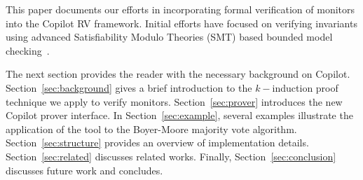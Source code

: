                                      
This paper documents our efforts in incorporating formal verification
of monitors into the Copilot RV framework.  Initial efforts have
focused on verifying invariants using advanced Satisfiability Modulo
Theories (SMT) based bounded model
checking~\cite{ClarkeBounded01}.  




The next section provides the reader with the necessary background on
Copilot. Section~\ref{sec:background} gives a brief introduction to
the $k-$induction proof technique we apply to verify
monitors.
Section~\ref{sec:prover} introduces the new Copilot prover
interface. In Section~\ref{sec:example}, several examples illustrate
the application of the tool to the Boyer-Moore majority vote
algorithm. Section~\ref{sec:structure} provides an overview of
implementation details. Section~\ref{sec:related} discusses related
works. Finally, Section~\ref{sec:conclusion}
discusses future work and concludes.



  







